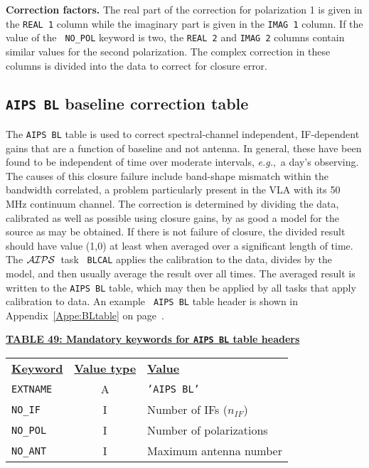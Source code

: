 \documentclass[twoside]{article}
\newcommand{\AIPS}{{$\cal AIPS\/$}}
\newcommand{\eg}{{\it e.g.},}
\newcommand{\nif}{$n_{IF}$}
\begin{document}
{\bf Correction factors.}  The real part of the correction for
polarization 1 is given in the {\tt REAL 1} column while the imaginary
part is given in the {\tt IMAG 1} column.  If the value of the {\tt
  NO\_POL} keyword is two, the {\tt REAL 2} and {\tt IMAG 2} columns
contain similar values for the second polarization.  The complex
correction in these columns is divided into the data to correct for
closure error.

\subsection{{\tt AIPS BL} baseline correction table}
\label{s:BL}

The {\tt AIPS BL} table is used to correct spectral-channel
independent, IF-dependent gains that are a function of baseline and
not antenna.  In general, these have been found to be independent of
time over moderate intervals, \eg\ a day's observing.  The causes of
this closure failure include band-shape mismatch within the bandwidth
correlated, a problem particularly present in the VLA with its 50 MHz
continuum channel.  The correction is determined by dividing the data,
calibrated as well as possible using closure gains, by as good a model
for the source as may be obtained.  If there is not failure of
closure, the divided result should have value (1,0) at least when
averaged over a significant length of time.  The \AIPS\ task {\tt
  BLCAL} applies the calibration to the data, divides by the model,
and then usually average the result over all times.  The averaged
result is written to the {\tt AIPS BL} table, which may then be
applied by all tasks that apply calibration to data.  An example {\tt
  AIPS BL} table header is shown in Appendix~\ref{Appe:BLtable} on
page~\pageref{Appe:BLtable}.

\begin{center}
\underline{\bf{TABLE 49: Mandatory keywords for {\tt AIPS BL} table
    headers}}\\
\begin{tabular}{lcl}
\noalign{\vspace{2pt}} \label{ta:BLkeys}
\underline{{\bf Keyword}} & \underline{\bf{Value type}} &
    \underline{\bf{Value\vphantom{y}}} \\
\noalign{\vspace{2pt}}
{\tt EXTNAME}   & A & {\tt 'AIPS BL'}  \\
{\tt NO\_IF}    & I & Number of IFs (\nif)\\
{\tt NO\_POL}   & I & Number of polarizations \\
{\tt NO\_ANT}   & I & Maximum antenna number
\end{tabular}
\end{center}
\end{document}
